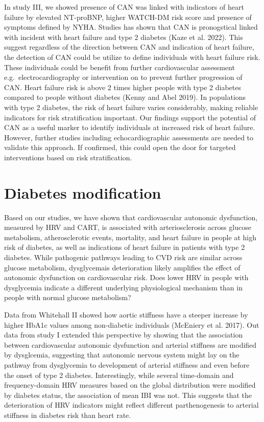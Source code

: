 \documentclass[
  a4paper,
  headsepline=true,
  open=any]{scrbook}
\begin{document}
In study III, we showed presence of CAN was linked with indicators of
heart failure by elevated NT-proBNP, higher WATCH-DM risk score and
presence of symptoms defined by NYHA. Studies has shown that CAN is
pronogstical linked with incident with heart failure and type 2 diabetes
(Kaze et al. 2022). This suggest regardless of the direction between CAN
and indication of heart failure, the detection of CAN could be utilize
to define individuals with heart failure risk. These individuals could
be benefit from further cardiovascular assessment
e.g.~electrocardiography or intervention on to prevent further
progression of CAN. Heart failure risk is above 2 times higher people
with type 2 diabetes compared to people without diabetes (Kenny and Abel
2019). In populations with type 2 diabetes, the risk of heart failure
varies considerably, making reliable indicators for risk stratification
important. Our findings support the potential of CAN as a useful marker
to identify individuals at increased risk of heart failure. However,
further studies including echocardiographic assessments are needed to
validate this approach. If confirmed, this could open the door for
targeted interventions based on risk stratification.

\hypertarget{diabetes-modification}{%
\section{Diabetes modification}\label{diabetes-modification}}

Based on our studies, we have shown that cardiovascular autonomic
dysfunction, measured by HRV and CART, is associated with
arteriosclerosis across glucose metabolism, atherosclerotic events,
mortality, and heart failure in people at high risk of diabetes, as well
as indications of heart failure in patients with type 2 diabetes. While
pathogenic pathways leading to CVD risk are similar across glucose
metabolism, dysglycemais deterioration likely amplifies the effect of
autonomic dysfunction on cardiovascular risk. Does lower HRV in people
with dysglycemia indicate a different underlying physiological mechanism
than in people with normal glucose metabolism?

Data from Whitehall II showed how aortic stiffness have a steeper
increase by higher HbA1c values among non-diabetic individuals (McEniery
et al. 2017). Out data from study I extended this perspective by showing
that the association between cardiovascular autonomic dysfunction and
arterial stiffness are modified by dysglcemia, suggesting that autonomic
nervous system might lay on the pathway from dysglycemia to development
of arterial stiffness and even before the onset of type 2 diabetes.
Interestingly, while several time-domain and frequency-domain HRV
measures based on the global distribution were modified by diabetes
status, the association of mean IBI was not. This suggests that the
deterioration of HRV indicators might reflect different parthenogenesis
to arterial stiffness in diabetes risk than heart rate.
\end{document}
